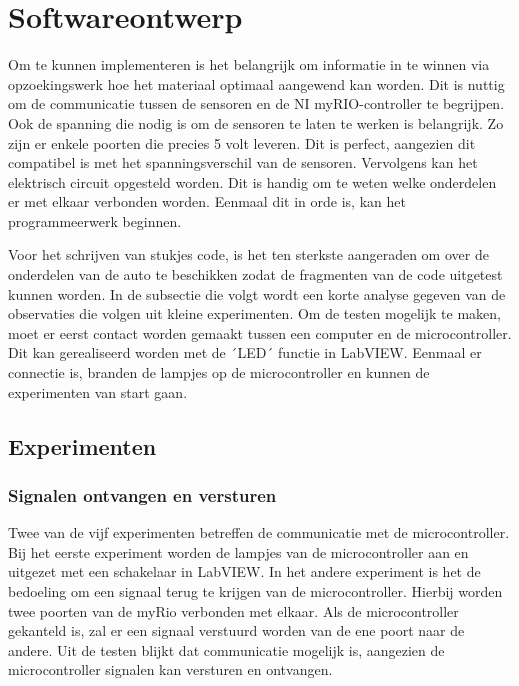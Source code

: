 \documentclass[a4paper,twoside,kulak]{kulakreport} %
\begin{document}
\section{Softwareontwerp}\label{Softwareontwerp}

Om te kunnen implementeren is het belangrijk om informatie in te winnen via opzoekingswerk hoe het materiaal optimaal aangewend kan worden.
Dit is nuttig om de communicatie tussen de sensoren en de NI myRIO-controller te begrijpen. Ook de spanning die nodig is om de sensoren te laten te werken is belangrijk. Zo zijn er enkele poorten die precies 5 volt leveren. Dit is perfect, aangezien dit compatibel is met het spanningsverschil van de sensoren. Vervolgens kan het elektrisch circuit opgesteld worden. Dit is handig om te weten welke onderdelen er met elkaar verbonden worden. Eenmaal dit in orde is, kan het programmeerwerk beginnen.

Voor het schrijven van stukjes code, is het ten sterkste aangeraden om over de onderdelen van de auto te beschikken zodat de fragmenten van de code uitgetest kunnen worden. In de subsectie die volgt wordt een korte analyse gegeven van de observaties die volgen uit kleine experimenten. Om de testen mogelijk te maken, moet er eerst contact worden gemaakt tussen een computer en de microcontroller. Dit kan gerealiseerd worden met de ´LED´ functie in LabVIEW. Eenmaal er connectie is, branden de lampjes op de microcontroller en kunnen de experimenten van start gaan.


\subsection{Experimenten}
\subsubsection{Signalen ontvangen en versturen}
Twee van de vijf experimenten betreffen de communicatie met de microcontroller. 
Bij het eerste experiment worden de lampjes van de microcontroller aan en uitgezet met een schakelaar in LabVIEW.
In het andere experiment is het de bedoeling om een signaal terug te krijgen van de microcontroller.
Hierbij worden twee poorten van de myRio verbonden met elkaar. Als de microcontroller gekanteld is, zal er een signaal verstuurd worden van de ene poort naar de andere.
Uit de testen blijkt dat communicatie mogelijk is, aangezien de microcontroller signalen kan versturen en ontvangen.
\end{document}
